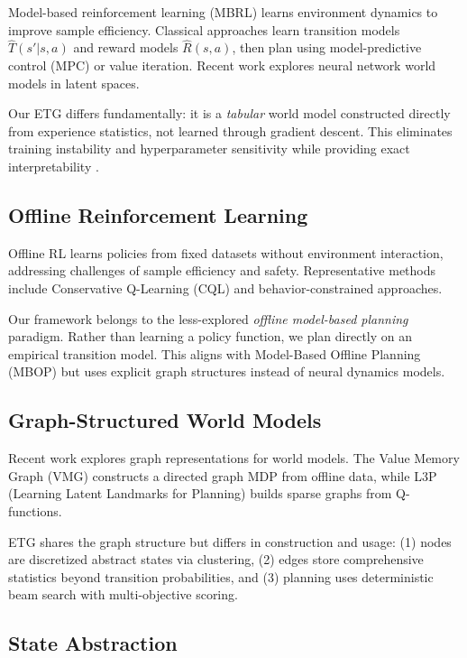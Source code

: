 \documentclass[letterpaper]{article}
\begin{document}
Model-based reinforcement learning (MBRL) learns environment dynamics to improve sample efficiency. Classical approaches learn transition models $\hat{T}(s'|s,a)$ and reward models $\hat{R}(s,a)$, then plan using model-predictive control (MPC) or value iteration. Recent work explores neural network world models in latent spaces.

Our ETG differs fundamentally: it is a \textit{tabular} world model constructed directly from experience statistics, not learned through gradient descent. This eliminates training instability and hyperparameter sensitivity while providing exact interpretability \cite{zhu2023vmg}.

\subsection{Offline Reinforcement Learning}

Offline RL learns policies from fixed datasets without environment interaction, addressing challenges of sample efficiency and safety. Representative methods include Conservative Q-Learning (CQL) and behavior-constrained approaches.

Our framework belongs to the less-explored \textit{offline model-based planning} paradigm. Rather than learning a policy function, we plan directly on an empirical transition model. This aligns with Model-Based Offline Planning (MBOP) \cite{argenson2021mbop} but uses explicit graph structures instead of neural dynamics models.

\subsection{Graph-Structured World Models}

Recent work explores graph representations for world models. The Value Memory Graph (VMG) \cite{zhu2023vmg} constructs a directed graph MDP from offline data, while L3P (Learning Latent Landmarks for Planning) \cite{zhang2021l3p} builds sparse graphs from Q-functions.

ETG shares the graph structure but differs in construction and usage: (1) nodes are discretized abstract states via clustering, (2) edges store comprehensive statistics beyond transition probabilities, and (3) planning uses deterministic beam search with multi-objective scoring.

\subsection{State Abstraction}
\end{document}
